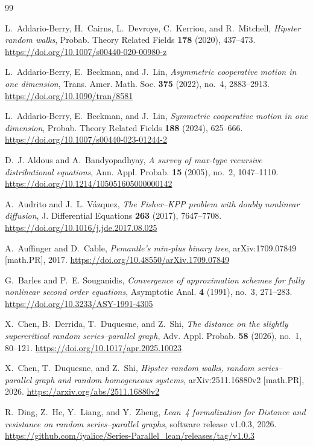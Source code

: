 \documentclass[12pt]{amsart}
\numberwithin{equation}{section}
\theoremstyle{plain}
\theoremstyle{definition}
\begin{document}
\begin{thebibliography}{99}

L.~Addario-Berry, H.~Cairns, L.~Devroye, C.~Kerriou, and R.~Mitchell,
\emph{Hipster random walks},
Probab. Theory Related Fields \textbf{178} (2020), 437--473.
\url{https://doi.org/10.1007/s00440-020-00980-z}

L.~Addario-Berry, E.~Beckman, and J.~Lin,
\emph{Asymmetric cooperative motion in one dimension},
Trans. Amer. Math. Soc. \textbf{375} (2022), no.~4, 2883--2913.
\url{https://doi.org/10.1090/tran/8581}

L.~Addario-Berry, E.~Beckman, and J.~Lin,
\emph{Symmetric cooperative motion in one dimension},
Probab. Theory Related Fields \textbf{188} (2024), 625--666.
\url{https://doi.org/10.1007/s00440-023-01244-2}

D.~J. Aldous and A.~Bandyopadhyay,
\emph{A survey of max-type recursive distributional equations},
Ann. Appl. Probab. \textbf{15} (2005), no.~2, 1047--1110.
\url{https://doi.org/10.1214/105051605000000142}

A.~Audrito and J.~L. V\'azquez,
\emph{The Fisher--KPP problem with doubly nonlinear diffusion},
J. Differential Equations \textbf{263} (2017), 7647--7708.
\url{https://doi.org/10.1016/j.jde.2017.08.025}

A.~Auffinger and D.~Cable,
\emph{Pemantle's min-plus binary tree},
arXiv:1709.07849 [math.PR], 2017.
\url{https://doi.org/10.48550/arXiv.1709.07849}

G.~Barles and P.~E. Souganidis,
\emph{Convergence of approximation schemes for fully nonlinear second order
equations},
Asymptotic Anal. \textbf{4} (1991), no.~3, 271--283.
\url{https://doi.org/10.3233/ASY-1991-4305}

X.~Chen, B.~Derrida, T.~Duquesne, and Z.~Shi,
\emph{The distance on the slightly supercritical random series--parallel graph},
Adv. Appl. Probab. \textbf{58} (2026), no.~1, 80--121.
\url{https://doi.org/10.1017/apr.2025.10023}

X.~Chen, T.~Duquesne, and Z.~Shi,
\emph{Hipster random walks, random series--parallel graph and random homogeneous
systems},
arXiv:2511.16880v2 [math.PR], 2026.
\url{https://arxiv.org/abs/2511.16880v2}

R.~Ding, Z.~He, Y.~Liang, and Y.~Zheng,
\emph{Lean~4 formalization for Distance and resistance on random series--parallel graphs},
software release v1.0.3, 2026.
\url{https://github.com/iyalice/Series-Parallel_lean/releases/tag/v1.0.3}


\end{thebibliography}
\end{document}
